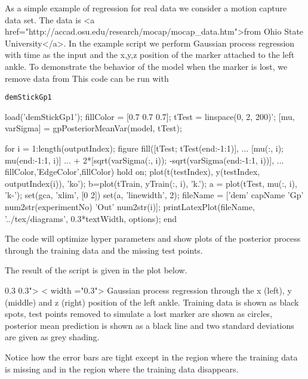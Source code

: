 As a simple example of regression for real data we consider a motion capture data set. The data is <a href="http://accad.osu.edu/research/mocap/mocap_data.htm">from Ohio State University</a>. In the example script we perform Gaussian process regression with time as the input and the x,y,z position of the marker attached to the left ankle. To demonstrate the behavior of the model when the marker is lost, we remove data from This code can be run with

\begin{verbatim}  
demStickGp1 
\end{verbatim} 

\begin{octave}
load('demStickGp1');
fillColor = [0.7 0.7 0.7];
tTest = linspace(0, 2, 200)';
[mu, varSigma] = gpPosteriorMeanVar(model, tTest);

for i = 1:length(outputIndex);
  figure
  fill([tTest; tTest(end:-1:1)], ...
       [mu(:, i); mu(end:-1:1, i)] ...
       + 2*[sqrt(varSigma(:, i)); -sqrt(varSigma(end:-1:1, i))], ...
       fillColor,'EdgeColor',fillColor)
  hold on;
  plot(t(testIndex), y(testIndex, outputIndex(i)), 'ko');
  b=plot(tTrain, yTrain(:, i), 'k.');
  a = plot(tTest, mu(:, i), 'k-');
  set(gca, 'xlim', [0 2])
  set(a, 'linewidth', 2);
  fileName = ['dem' capName 'Gp' num2str(experimentNo) 'Out' num2str(i)];
  printLatexPlot(fileName, '../tex/diagrams', 0.3*textWidth, options);
end
\end{octave}

The code will optimize hyper parameters and show plots of the posterior process through the training data and the missing test points.

The result of the script is given in the plot below.  

\begin{center}
 0.3\textwidth {} 0.3\textwidth"> < width
="0.3\textwidth"> Gaussian process regression through the x (left), y (middle) and z (right) position of the left ankle. Training data is shown as black spots, test points removed to simulate a lost marker are shown as circles, posterior mean
prediction is shown as a black line and two standard deviations are
given as grey shading.\end{center}

Notice how the error bars are tight except in the region where the training data is missing and in the region where the training data disappears.

